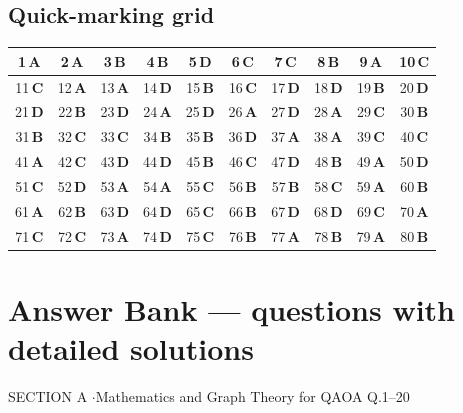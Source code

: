 \documentclass[11pt,a4paper]{article}
\begin{document}
\subsection*{Quick-marking grid}
\begin{center}\renewcommand{\arraystretch}{1.3}
\begin{tabular}{|c|c|c|c|c|c|c|c|c|c|}\hline
1\,\textbf{A} & 2\,\textbf{A} & 3\,\textbf{B} & 4\,\textbf{B} & 5\,\textbf{D} & 6\,\textbf{C} & 7\,\textbf{C} & 8\,\textbf{B} & 9\,\textbf{A} & 10\,\textbf{C} \\
\hline
11\,\textbf{C} & 12\,\textbf{A} & 13\,\textbf{A} & 14\,\textbf{D} & 15\,\textbf{B} & 16\,\textbf{C} & 17\,\textbf{D} & 18\,\textbf{D} & 19\,\textbf{B} & 20\,\textbf{D} \\
\hline
21\,\textbf{D} & 22\,\textbf{B} & 23\,\textbf{D} & 24\,\textbf{A} & 25\,\textbf{D} & 26\,\textbf{A} & 27\,\textbf{D} & 28\,\textbf{A} & 29\,\textbf{C} & 30\,\textbf{B} \\
\hline
31\,\textbf{B} & 32\,\textbf{C} & 33\,\textbf{C} & 34\,\textbf{B} & 35\,\textbf{B} & 36\,\textbf{D} & 37\,\textbf{A} & 38\,\textbf{A} & 39\,\textbf{C} & 40\,\textbf{C} \\
\hline
41\,\textbf{A} & 42\,\textbf{C} & 43\,\textbf{D} & 44\,\textbf{D} & 45\,\textbf{B} & 46\,\textbf{C} & 47\,\textbf{D} & 48\,\textbf{B} & 49\,\textbf{A} & 50\,\textbf{D} \\
\hline
51\,\textbf{C} & 52\,\textbf{D} & 53\,\textbf{A} & 54\,\textbf{A} & 55\,\textbf{C} & 56\,\textbf{B} & 57\,\textbf{B} & 58\,\textbf{C} & 59\,\textbf{A} & 60\,\textbf{B} \\
\hline
61\,\textbf{A} & 62\,\textbf{B} & 63\,\textbf{D} & 64\,\textbf{D} & 65\,\textbf{C} & 66\,\textbf{B} & 67\,\textbf{D} & 68\,\textbf{D} & 69\,\textbf{C} & 70\,\textbf{A} \\
\hline
71\,\textbf{C} & 72\,\textbf{C} & 73\,\textbf{A} & 74\,\textbf{D} & 75\,\textbf{C} & 76\,\textbf{B} & 77\,\textbf{A} & 78\,\textbf{B} & 79\,\textbf{A} & 80\,\textbf{B} \\
\hline\end{tabular}\end{center}
\newpage
\section*{Answer Bank --- questions with detailed solutions}\label{bank}

\begin{sectionbanner}SECTION A \enspace$\cdot$\enspace Mathematics and Graph Theory for QAOA \hfill Q.1--20\end{sectionbanner}
\end{document}
